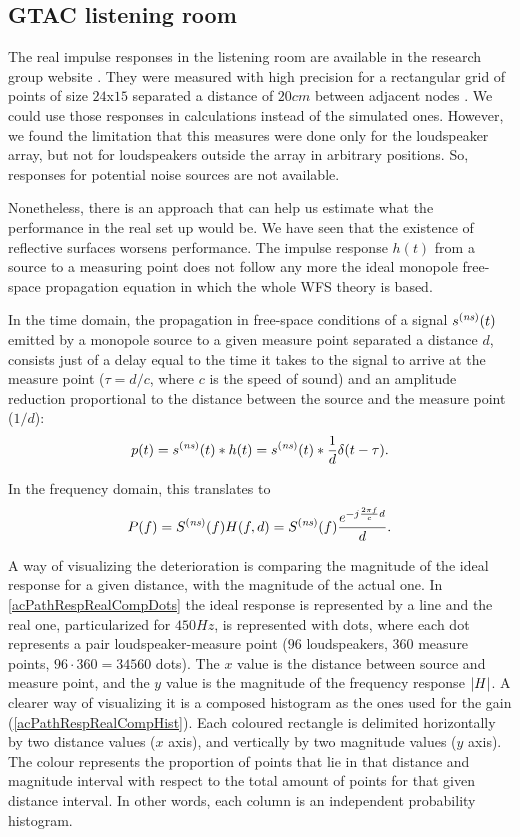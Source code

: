 \subsection{GTAC listening room}
The real impulse responses in the listening room are available in the research group website \cite{GTACroom}. They were measured with high precision for a rectangular grid of points of size $24$x$15$ separated a distance of $20\si{cm}$ between adjacent nodes \cite{Czy2011}. We could use those responses in calculations instead of the simulated ones. However, we found the limitation that
this measures were done only for the loudspeaker array, but not for loudspeakers outside the array in arbitrary positions. So, responses for potential noise sources are not available.

Nonetheless, there is an approach that can help us estimate what the performance in the real set up would be. We have seen that the existence of reflective surfaces worsens performance. The impulse response $h(t)$ from a source to a measuring point does not follow any more the ideal monopole free-space propagation equation in which the whole WFS theory is based.

In the time domain, the propagation in free-space conditions of a signal $\signal[ns][time](t)$ emitted by a monopole source to a given measure point separated a distance $d$, consists just of a delay equal to the time it takes to the signal to arrive at the measure point ($\tau = d/c$, where $c$ is the speed of sound) and an amplitude reduction proportional to the distance between the source and the measure point ($1/d$):
\begin{equation}
\Field[noValue][time](t) = \signal[ns][time](t) \ast h(t) = \signal[ns][time](t) \ast \frac{1}{d}\delta(t - \tau).
\end{equation}

In the frequency domain, this translates to
\begin{equation}
\Field[noValue][frequency](f) = \signal[ns][frequency](f) H(f,d) = \signal[ns][frequency](f) \frac{e^{-j\frac{2\pi f}{c}d}}{d}.
\end{equation}

A way of visualizing the deterioration is comparing the magnitude of the ideal response for a given distance, with the magnitude of the actual one. In \autoref{acPathRespRealCompDots} the ideal response is represented by a line and the real one, particularized for $450 \si{Hz}$, is represented with dots, where each dot represents a pair loudspeaker-measure point ($96$ loudspeakers, $360$ measure points, $96\cdot 360 = 34560$ dots). The $x$ value is the distance between source and measure point, and the $y$ value is the magnitude of the frequency response $\left| H \right|$. A clearer way of visualizing it is a composed histogram as the ones used for the gain (\autoref{acPathRespRealCompHist}). 
Each coloured rectangle is delimited horizontally by two distance values ($x$ axis), and vertically by two magnitude values ($y$ axis). The colour represents the proportion of points that lie in that distance and magnitude interval with respect to the total amount of points for that given distance interval. In other words, each column is an independent probability histogram.

